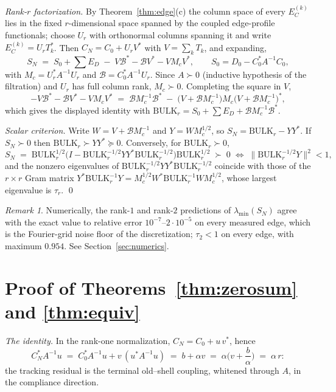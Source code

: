 \documentclass[11pt,reqno]{amsart}
\theoremstyle{plain}
\theoremstyle{definition}
\theoremstyle{remark}
\newtheorem{remark}[theorem]{Remark}
\newcommand{\eigmin}{\lambda_{\min}}
\begin{document}
\emph{Rank-$r$ factorization.} By Theorem~\ref{thm:edge}(c) the column space of every
$E_C^{(k)}$ lies in the fixed $r$-dimensional space spanned by the coupled edge-profile
functionals; choose $U_r$ with orthonormal columns spanning it and write
$E_C^{(k)} = U_r T_k^*$. Then $C_N = C_0 + U_r V^*$ with $V = \sum_k T_k$, and expanding,
\[
S_N \;=\; S_0 + \textstyle\sum E_D \;-\; V \mathcal{B}^* - \mathcal{B} V^* - V M_c V^*,
\qquad S_0 = D_0 - C_0^* A^{-1} C_0 ,
\]
with $M_c = U_r^* A^{-1} U_r$ and $\mathcal{B} = C_0^* A^{-1} U_r$. Since $A \succ 0$ (inductive
hypothesis of the filtration) and $U_r$ has full column rank, $M_c \succ 0$. Completing the
square in $V$,
\[
- V \mathcal{B}^* - \mathcal{B} V^* - V M_c V^* \;=\; \mathcal{B} M_c^{-1} \mathcal{B}^* \;-\; \big(V + \mathcal{B} M_c^{-1}\big) M_c
\big(V + \mathcal{B} M_c^{-1}\big)^* ,
\]
which gives the displayed identity with $\mathrm{BULK}_r = S_0 + \sum E_D + \mathcal{B} M_c^{-1} \mathcal{B}^*$.

\emph{Scalar criterion.} Write $W = V + \mathcal{B} M_c^{-1}$ and $Y = W M_c^{1/2}$, so
$S_N = \mathrm{BULK}_r - Y Y^*$. If $S_N \succ 0$ then $\mathrm{BULK}_r \succ Y Y^*
\succeq 0$. Conversely, for $\mathrm{BULK}_r \succ 0$,
\[
S_N \;=\; \mathrm{BULK}_r^{1/2}\Big( I - \mathrm{BULK}_r^{-1/2} Y Y^* \mathrm{BULK}_r^{-1/2}
\Big)\mathrm{BULK}_r^{1/2} \;\succ\; 0
\;\iff\;
\big\| \mathrm{BULK}_r^{-1/2} Y \big\|^2 < 1 ,
\]
and the nonzero eigenvalues of $\mathrm{BULK}_r^{-1/2} Y Y^* \mathrm{BULK}_r^{-1/2}$
coincide with those of the $r \times r$ Gram matrix
$Y^* \mathrm{BULK}_r^{-1} Y = M_c^{1/2} W^* \mathrm{BULK}_r^{-1} W M_c^{1/2}$, whose largest
eigenvalue is $\tau_r$. \qed

\begin{remark}
Numerically, the rank-$1$ and rank-$2$ predictions of $\eigmin(S_N)$ agree with the exact
value to relative error $10^{-7}$--$2\cdot 10^{-5}$ on every measured edge, which is the
Fourier-grid noise floor of the discretization; $\tau_2 < 1$ on every edge, with maximum
$0.954$. See Section~\ref{sec:numerics}.
\end{remark}

\section{Proof of Theorems~\ref{thm:zerosum} and \ref{thm:equiv}}

\emph{The identity.} In the rank-one normalization, $C_N = C_0 + u\,v^*$, hence
\[
C_N^* A^{-1} u \;=\; C_0^* A^{-1} u + v\,(u^* A^{-1} u) \;=\; b + \alpha v
\;=\; \alpha\Big( v + \frac{b}{\alpha} \Big) \;=\; \alpha\, r :
\]
the tracking residual is the terminal old--shell coupling, whitened through $A$, in the
compliance direction.
\end{document}

